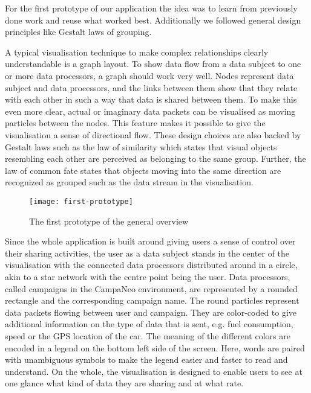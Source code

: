 \documentclass[../paper.tex]{subfiles}
\begin{document}
  For the first prototype of our application the idea was to learn from
  previously done work and reuse what worked best. Additionally we followed
  general design principles like Gestalt laws \cite{wiki:principles_of_grouping}
  of grouping. 

  A typical visualisation technique to make complex relationships clearly
  understandable is a graph layout. To show data flow from a data subject to one
  or more data processors, a graph should work very well. Nodes represent data
  subject and data processors, and the links between them show that they relate
  with each other in such a way that data is shared between them. To make this
  even more clear, actual or imaginary data packets can be visualised as moving
  particles between the nodes. This feature makes it possible to give the
  visualisation a sense of directional flow.
  These design choices are also backed by Gestalt laws such as the law of 
  similarity which states that visual objects resembling each other are 
  perceived as belonging to the same group. Further, the law of common fate 
  states that objects moving into the same direction are recognized as grouped
  such as the data stream in the visualisation.    

  \begin{figure}
    \centering
    \texttt{[image: first-prototype]}
    \caption{The first prototype of the general overview}
    \label{fig:prototype}
  \end{figure}

  Since the whole application is built around giving users a sense of control
  over their sharing activities, the user as a data subject stands in the center of
  the visualisation with the connected data processors distributed around in a
  circle, akin to a star network \cite{wiki:star_network} with the centre point
  being the user. Data processors, called campaigns in the CampaNeo environment, are
  represented by a rounded rectangle and the corresponding campaign name. The round
  particles represent data packets flowing between user and campaign. They are
  color-coded to give additional information on the type of data that is sent,
  e.g. fuel consumption, speed or the GPS location of the car.
  The meaning of the different colors are encoded in a legend on the bottom left
  side of the screen. Here, words are paired with unambiguous symbols to make the
  legend easier and faster to read and understand. On the whole, the visualisation
  is designed to enable users to see at one glance what kind of data they are sharing
  and at what rate.
\end{document}

